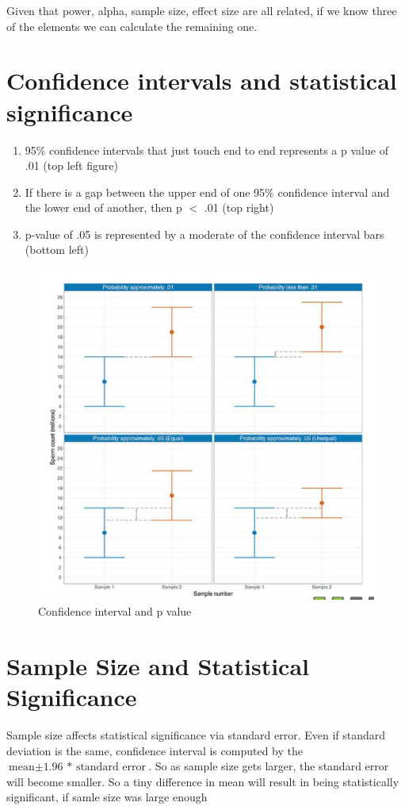 Given that power, alpha, sample size, effect size are all related, if we know three of the elements we can calculate the remaining one.

\section{Confidence intervals and statistical significance}
\begin{enumerate}
\item 95\% confidence intervals that just touch end to end represents a p value of .01 (top left figure)
\item If there is a gap between the upper end of one 95\% confidence interval and the lower end of another, then p $<$ .01 (top right)
\item p-value of .05 is represented by a moderate of the confidence interval bars (bottom left)
\end{enumerate}

\graphicspath{{C:/Latex Documents/PL2132 textbook notes}}
\begin{figure}[p]
 \includegraphics{Chapter 2 Spine of Statistics/confidenceintervalbars.PNG}
  \caption{Confidence interval and p value}
  \label{Fig: confidence intervals and p values}
\end{figure}

\section{Sample Size and Statistical Significance}

Sample size affects statistical significance via standard error. Even if standard deviation is the same, confidence interval is computed by the $\text{mean} \pm \text{1.96 * standard error}$. So as sample size gets larger, the standard error will become smaller. So a tiny difference in mean will result in being statistically significant, if samle size was large enough


%